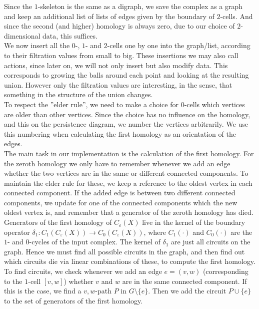 \documentclass[11pt, a4paper, UKenglish]{article}
\begin{document}
    Since the $1$-skeleton is the same as a digraph, we save the complex as a graph and keep an additional list of lists of edges given by the boundary of $2$-cells.
    And since the second (and higher) homology is always zero, due to our choice of $2$-dimensional data, this suffices.\\
    We now insert all  the $0$-, $1$- and $2$-cells one by one into the graph/list, according to their filtration values from small to big.
    These insertions we may also call actions, since later on, we will not only insert but also modify data.
    This corresponds to growing the balls around each point and looking at the resulting union.
    However only the filtration values are interesting, in the sense, that something in the structure of the union changes.\\
    To respect the ''elder rule'', we need to make a choice for $0$-cells which vertices are older than other vertices.
    Since the choice has no influence on the homology, and this on the persistence diagram, we number the vertices arbitrarily.
    We use this numbering when calculating the first homology as an orientation of the edges.\\
    The main task in our implementation is the calculation of the first homology.
    For the zeroth homology we only have to remember whenever we add an edge whether the two vertices are in the same or different connected components.
    To maintain the elder rule for these, we keep a reference to the oldest vertex in each connected component.
    If the added edge is between two different connected components, we update for one of the connected components which the new oldest vertex is, and remember that a generator of the zeroth homology has died.\\
    Generators of the first homology of $C_\varepsilon(X)$ live in the kernel of the boundary operator $\delta_1:C_1(C_\varepsilon(X))\rightarrow C_0(C_\varepsilon(X))$, where $C_1(\cdot)$ and $C_0(\cdot)$ are the $1$- and $0$-cycles of the input complex.
    The kernel of $\delta_1$ are just all circuits on the graph.
    Hence we must find all possible circuits in the graph, and then find out which circuits die via linear combinations of these, to compute the first homology.
    To find circuits, we check whenever we add an edge $e=(v,w)$ (corresponding to the $1$-cell $[v,w]$) whether $v$ and $w$ are in the same connected component.
    If this is the case, we find a $v,w$-path $P$ in $G\setminus \{e\}$.
    Then we add the circuit $P\cup \{e\}$ to the set of generators of the first homology.
\end{document}
